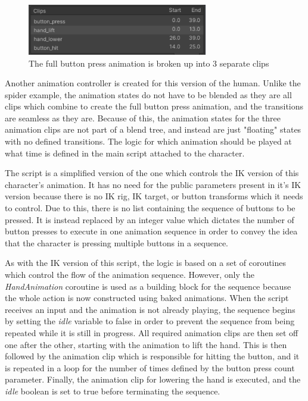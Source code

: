 \begin{figure}[h!]
    \centering
    \captionsetup{justification=centering}
    \includegraphics[width=0.7\textwidth]{grafika/bp_clips.png}
    \caption{The full button press animation is broken up into 3 separate clips}
    \label{fig:bp_clips}
\end{figure}

Another animation controller is created for this version of the human. Unlike
the spider example, the animation states do not have to be blended as they are
all clips which combine to create the full button press animation, and the
transitions are seamless as they are. Because of this, the animation states for
the three animation clips are not part of a blend tree, and instead are just
"floating" states with no defined transitions. The logic for which animation
should be played at what time is defined in the main script attached to the
character. 

The script is a simplified version of the one which controls the IK version of
this character's animation. It has no need for the public parameters present in
it's IK version because there is no IK rig, IK target, or button transforms
which it needs to control. Due to this, there is no list containing the sequence
of buttons to be pressed. It is instead replaced by an integer value which
dictates the number of button presses to execute in one animation sequence in
order to convey the idea that the character is pressing multiple buttons in
a sequence. 

As with the IK version of this script, the logic is based on a set of coroutines
which control the flow of the animation sequence. However, only the
\textit{HandAnimation} coroutine is used as a building block for the sequence
because the whole action is now constructed using baked animations. When the
script receives an input and the animation is not already playing, the sequence
begins by setting the \textit{idle} variable to false in order to prevent the sequence
from being repeated while it is still in progress. All required animation clips
are then set off one after the other, starting with the animation to lift the
hand. This is then followed by the animation clip which is responsible for
hitting the button, and it is repeated in a loop for the number of times defined
by the button press count parameter. Finally, the animation clip for lowering
the hand is executed, and the \textit{idle} boolean is set to true before
terminating the sequence.

